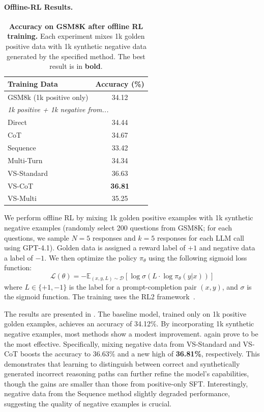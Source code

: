 \paragraph{Offline-RL Results.}
\begin{table}[h]
\centering
\caption{\textbf{Accuracy on GSM8K after offline RL training.} Each experiment mixes 1k golden positive data with 1k synthetic negative data generated by the specified method. The best result is in \textbf{bold}.}
\label{tab:negative_data_training}
\begin{tabular}{lc}
\toprule
\textbf{Training Data} & \textbf{Accuracy (\%)} \\
\midrule
GSM8k (1k positive only) & 34.12 \\
\midrule
\multicolumn{2}{l}{\textit{1k positive + 1k negative from...}} \\
\quad Direct & 34.44 \\
\quad CoT & 34.67 \\
\quad Sequence & 33.42 \\
\quad Multi-Turn & 34.34 \\
\quad VS-Standard & 36.63 \\
\quad VS-CoT & \textbf{36.81} \\
\quad VS-Multi & 35.25 \\
\bottomrule
\end{tabular}
\end{table}
We perform offline RL by mixing 1k golden positive examples with 1k synthetic negative examples (randomly select 200 questions from GSM8K; for each questions, we sample $N=5$ responses and $k=5$ responses for each LLM call using GPT-4.1). Golden data is assigned a reward label of $+1$ and negative data a label of $-1$. We then optimize the policy $\pi_{\theta}$ using the following sigmoid loss function:
$$
\mathcal{L}(\theta) = -\mathbb{E}_{(x, y, L) \sim \mathcal{D}} \left[ \log \sigma \left( L \cdot \log \pi_{\theta}(y|x) \right) \right]
$$
where $L \in \{+1, -1\}$ is the label for a prompt-completion pair $(x, y)$, and $\sigma$ is the sigmoid function. The training uses the RL2 framework~\citep{Tan2025RL2}.

The results are presented in . The baseline model, trained only on 1k positive golden examples, achieves an accuracy of 34.12\%. By incorporating 1k synthetic negative examples, most methods show a modest improvement. \ours again prove to be the most effective. Specifically, mixing negative data from {VS-Standard} and {VS-CoT} boosts the accuracy to 36.63\% and a new high of \textbf{36.81\%}, respectively. This demonstrates that learning to distinguish between correct and synthetically generated incorrect reasoning paths can further refine the model's capabilities, though the gains are smaller than those from positive-only SFT. Interestingly, negative data from the {Sequence} method slightly degraded performance, suggesting the quality of negative examples is crucial.

